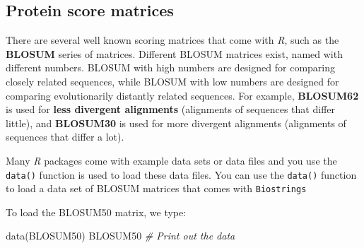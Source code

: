 \documentclass[
]{book}
\newenvironment{Shaded}{\begin{snugshade}}{\end{snugshade}}
\newcommand{\CommentTok}[1]{\textcolor[rgb]{0.56,0.35,0.01}{\textit{#1}}}
\newcommand{\FunctionTok}[1]{\textcolor[rgb]{0.00,0.00,0.00}{#1}}
\newcommand{\NormalTok}[1]{#1}
\begin{document}
\hypertarget{protein-score-matrices}{%
\subsection{Protein score matrices}\label{protein-score-matrices}}

There are several well known scoring matrices that come with \emph{R}, such as the \textbf{BLOSUM} series of matrices. Different BLOSUM matrices exist, named with different numbers. BLOSUM with high numbers are designed for comparing closely related sequences, while BLOSUM with low numbers are designed for comparing evolutionarily distantly related sequences. For example, \textbf{BLOSUM62} is used for \textbf{less divergent alignments} (alignments of sequences that differ little), and \textbf{BLOSUM30} is used for more divergent alignments (alignments of sequences that differ a lot).

Many \emph{R} packages come with example data sets or data files and you use the \texttt{data()} function is used to load these data files. You can use the \texttt{data()} function to load a data set of BLOSUM matrices that comes with \texttt{Biostrings}

To load the BLOSUM50 matrix, we type:

\begin{Shaded}
\begin{Highlighting}[]
\FunctionTok{data}\NormalTok{(BLOSUM50)}
\NormalTok{BLOSUM50 }\CommentTok{\# Print out the data}
\end{Highlighting}
\end{Shaded}
\end{document}
